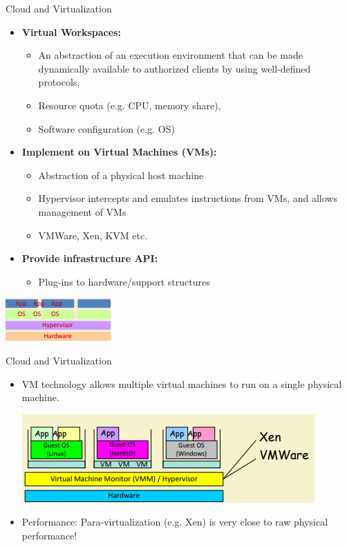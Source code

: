 \documentclass{SKP-beamer}
\begin{document}
\begin{frame}{Cloud and Virtualization}
	\begin{itemize}
		
		\item  \textbf{Virtual Workspaces:} 
		\begin{itemize}
			\item An abstraction of an execution environment that can be made dynamically available to
			authorized clients by using well-defined protocols,
			\item Resource quota (e.g. CPU, memory share),
			\item Software configuration (e.g. OS)
			
		\end{itemize}
	     \item  \textbf{Implement on Virtual Machines (VMs):} 
	     \begin{itemize}
	     	\item  Abstraction of a physical host machine
	     	\item Hypervisor intercepts and emulates instructions from VMs, and allows management of VMs
	     	\item VMWare, Xen, KVM etc.
	     	
	     \end{itemize}
	     \item  \textbf{Provide infrastructure API:} 
	     \begin{itemize}
	     	\item  Plug-ins to hardware/support 
	     	structures 
	     \end{itemize}
	     
	\end{itemize}
	
	\includegraphics[scale=1.5]{13.png}
	
\end{frame}


\begin{frame}{Cloud and Virtualization}
	\begin{itemize}
		
		\item  VM technology allows multiple virtual machines to run on a single
		physical machine.
		
		\includegraphics[scale=1.2]{14.png}
		
		\item Performance: Para-virtualization (e.g. Xen) is very close to raw physical
		performance!
	\end{itemize}
\end{frame}
\end{document}
